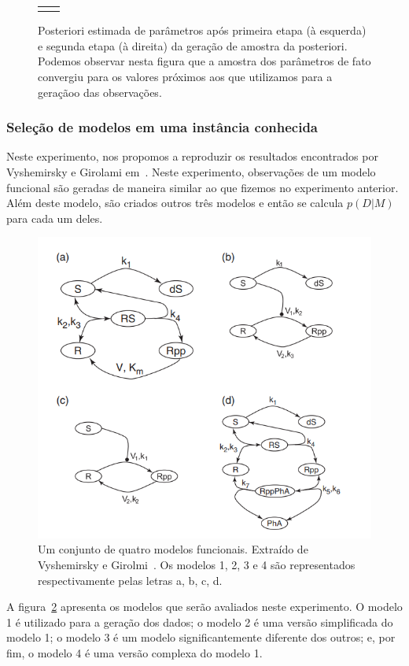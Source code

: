 \documentclass[12pt]{article}
\begin{document}
\begin{figure}[!ht]
\begin{tabular}{c c}
{    \label{fig:posterior_kcat_2} }
    \\
  \end{tabular}
    \caption{Posteriori estimada de parâmetros após primeira etapa (à 
    esquerda) e segunda etapa (à direita) da geração de amostra da 
    posteriori. Podemos observar nesta figura que a amostra dos 
    parâmetros de fato convergiu para os valores próximos aos que 
    utilizamos para a geraçãoo das observações.}
  \label{fig:posteriori_parameters} 
\end{figure}

\subsubsection{Seleção de modelos em uma instância conhecida}
Neste experimento, nos propomos a reproduzir os resultados encontrados 
por Vyshemirsky e Girolami em~\cite{Vyshemirsky2008}. Neste 
experimento, observações de um modelo funcional são geradas de maneira
similar ao que fizemos no experimento anterior. Além deste modelo, são
criados outros três modelos e então se calcula $p (D | M)$ para cada um
deles.

\begin{figure}[ht]
    \begin{center}
    \includegraphics[width=0.65\linewidth]{Vyshemirsky_models.png}
    \caption{Um conjunto de quatro modelos funcionais. Extraído de
        Vyshemirsky e Girolmi~\cite{Vyshemirsky}. Os modelos 1, 2, 3 e
        4 são representados respectivamente pelas letras a, b, c, d.}
    \label{fig:vyshemirsky_models}
    \end{center}

\end{figure}

A figura~\ref{fig:vyshemirsky_models} apresenta os modelos que serão
avaliados neste experimento. O modelo 1 é utilizado para a geração dos
dados; o modelo 2 é uma versão simplificada do modelo 1; o modelo 3 é
um modelo significantemente diferente dos outros; e, por fim, o modelo 4
é uma versão complexa do modelo 1. 
\end{document}
